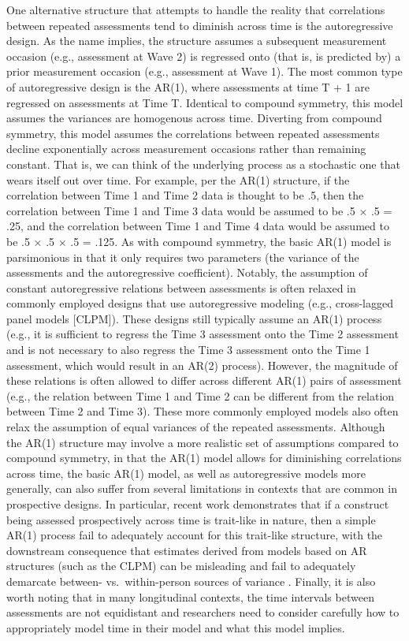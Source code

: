 \documentclass[
  number,
  preprint,
  3p,
  twocolumn]{elsarticle}
\begin{document}
One alternative structure that attempts to handle the reality that
correlations between repeated assessments tend to diminish across time
is the autoregressive design. As the name implies, the structure assumes
a subsequent measurement occasion (e.g., assessment at Wave 2) is
regressed onto (that is, is predicted by) a prior measurement occasion
(e.g., assessment at Wave 1). The most common type of autoregressive
design is the AR(1), where assessments at time T + 1 are regressed on
assessments at Time T. Identical to compound symmetry, this model
assumes the variances are homogenous across time. Diverting from
compound symmetry, this model assumes the correlations between repeated
assessments decline exponentially across measurement occasions rather
than remaining constant. That is, we can think of the underlying process
as a stochastic one that wears itself out over time. For example, per
the AR(1) structure, if the correlation between Time 1 and Time 2 data
is thought to be .5, then the correlation between Time 1 and Time 3 data
would be assumed to be .5 × .5 = .25, and the correlation between Time 1
and Time 4 data would be assumed to be .5 × .5 × .5 = .125. As with
compound symmetry, the basic AR(1) model is parsimonious in that it only
requires two parameters (the variance of the assessments and the
autoregressive coefficient). Notably, the assumption of constant
autoregressive relations between assessments is often relaxed in
commonly employed designs that use autoregressive modeling (e.g.,
cross-lagged panel models {[}CLPM{]}). These designs still typically
assume an AR(1) process (e.g., it is sufficient to regress the Time 3
assessment onto the Time 2 assessment and is not necessary to also
regress the Time 3 assessment onto the Time 1 assessment, which would
result in an AR(2) process). However, the magnitude of these relations
is often allowed to differ across different AR(1) pairs of assessment
(e.g., the relation between Time 1 and Time 2 can be different from the
relation between Time 2 and Time 3). These more commonly employed models
also often relax the assumption of equal variances of the repeated
assessments. Although the AR(1) structure may involve a more realistic
set of assumptions compared to compound symmetry, in that the AR(1)
model allows for diminishing correlations across time, the basic AR(1)
model, as well as autoregressive models more generally, can also suffer
from several limitations in contexts that are common in prospective
designs. In particular, recent work demonstrates that if a construct
being assessed prospectively across time is trait-like in nature, then a
simple AR(1) process fail to adequately account for this trait-like
structure, with the downstream consequence that estimates derived from
models based on AR structures (such as the CLPM) can be misleading and
fail to adequately demarcate between- vs.~within-person sources of
variance \citep{hamaker2015}. Finally, it is also worth noting that in
many longitudinal contexts, the time intervals between assessments are
not equidistant and researchers need to consider carefully how to
appropriately model time in their model and what this model implies.
\end{document}
